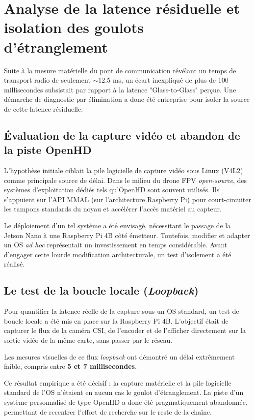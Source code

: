 \section{Analyse de la latence résiduelle et isolation des goulots d'étranglement}

Suite à la mesure matérielle du pont de communication révélant un temps de transport radio de seulement $\sim$12.5 ms, un écart inexpliqué de plus de 100 millisecondes subsistait par rapport à la latence "Glass-to-Glass" perçue. Une démarche de diagnostic par élimination a donc été entreprise pour isoler la source de cette latence résiduelle.

\subsection{Évaluation de la capture vidéo et abandon de la piste OpenHD}
L'hypothèse initiale ciblait la pile logicielle de capture vidéo sous Linux (V4L2) comme principale source de délai. 
Dans le milieu du drone FPV \textit{open-source}, des systèmes d'exploitation dédiés tels qu'OpenHD sont souvent utilisés. Ils s'appuient sur l'API MMAL (sur l'architecture Raspberry Pi) pour court-circuiter les tampons standards du noyau et accélérer l'accès matériel au capteur.

Le déploiement d'un tel système a été envisagé, nécessitant le passage de la Jetson Nano à une Raspberry Pi 4B côté émetteur. Toutefois, modifier et adapter un OS \textit{ad hoc} représentait un investissement en temps considérable. Avant d'engager cette lourde modification architecturale, un test d'isolement a été réalisé.

\subsection{Le test de la boucle locale (\textit{Loopback})}
Pour quantifier la latence réelle de la capture sous un OS standard, un test de boucle locale a été mis en place sur la Raspberry Pi 4B. L'objectif était de capturer le flux de la caméra CSI, de l'encoder et de l'afficher directement sur la sortie vidéo de la même carte, sans passer par le réseau.

Les mesures visuelles de ce flux \textit{loopback} ont démontré un délai extrêmement faible, compris entre \textbf{5 et 7 millisecondes}. 

Ce résultat empirique a été décisif : la capture matérielle et la pile logicielle standard de l'OS n'étaient en aucun cas le goulot d'étranglement. La piste d'un système personnalisé de type OpenHD a donc été pragmatiquement abandonnée, permettant de recentrer l'effort de recherche sur le reste de la chaîne.


